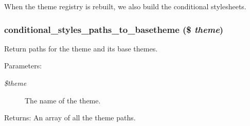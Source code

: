 When the theme registry is rebuilt, we also build the conditional stylesheets. \hypertarget{template_8conditional-styles_8inc_6acb74cfb52f6e1a84f2083239c7fcde}{
\subsubsection[{conditional\_\-styles\_\-paths\_\-to\_\-basetheme}]{\setlength{\rightskip}{0pt plus 5cm}conditional\_\-styles\_\-paths\_\-to\_\-basetheme (\$ {\em theme})}}
\label{template_8conditional-styles_8inc_6acb74cfb52f6e1a84f2083239c7fcde}


Return paths for the theme and its base themes.

\begin{Desc}
\item[Parameters:]
\begin{description}
\item[{\em \$theme}]The name of the theme. \end{description}
\end{Desc}
\begin{Desc}
\item[Returns:]An array of all the theme paths. \end{Desc}
